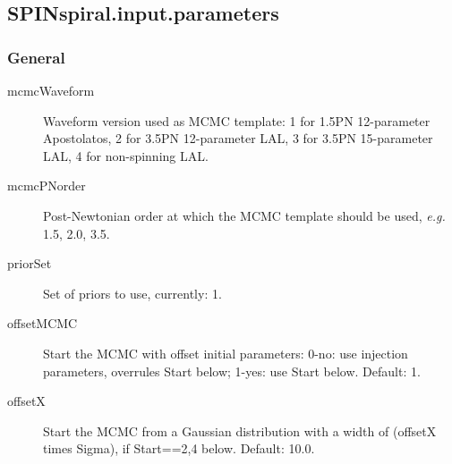 \documentclass[10pt]{article}
\begin{document}
   






\pagebreak

\subsection{SPINspiral.input.parameters}


\subsubsection{General}
\begin{description}                
\item[mcmcWaveform] Waveform version used as MCMC template:  1 for 1.5PN 12-parameter Apostolatos, 2 for 3.5PN 12-parameter LAL, 3 for 3.5PN 15-parameter LAL, 4 for non-spinning LAL.
\item[mcmcPNorder] Post-Newtonian order at which the MCMC template should be used, \textit{e.g.} 1.5, 2.0, 3.5.
\item[priorSet] Set of priors to use, currently: 1.
\item[offsetMCMC] Start the MCMC with offset initial parameters: 0-no: use injection parameters, overrules Start below; 1-yes: use Start below.  Default: 1.
\item[offsetX] Start the MCMC from a Gaussian distribution with a width of (offsetX times Sigma), if Start==2,4 below.  Default: 10.0.
\end{description}                
\end{document}
